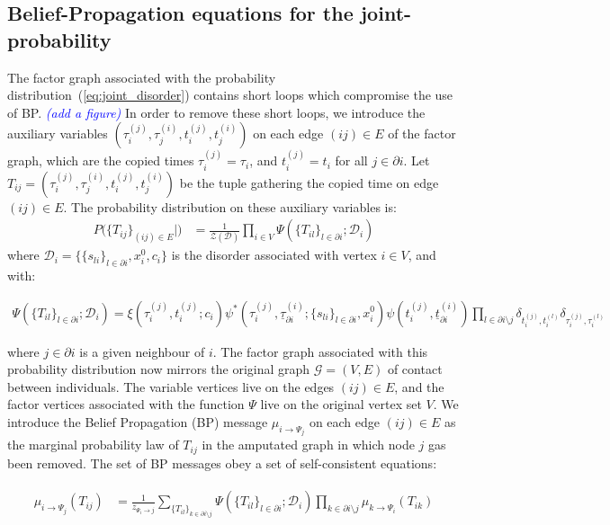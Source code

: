 \documentclass[a4paper, amsfonts, amssymb, amsmath, reprint, showkeys, nofootinbib, twoside, floatfix, pre,superscriptaddress]{revtex4-2}
\begin{document}
\subsection{Belief-Propagation equations for the joint-probability}
The factor graph associated with the probability distribution~(\ref{eq:joint_disorder}) contains short loops which compromise the use of BP. \textcolor{blue}{\it (add a figure)} 
In order to remove these short loops, we introduce the auxiliary variables $(\tau_i^{(j)},\tau_j^{(i)},t_i^{(j)},t_j^{(i)})$ on each edge $(ij)\in E$ of the factor graph, which are the copied times $\tau_i^{(j)}=\tau_i$, and $t_i^{(j)}=t_i$ for all $j\in\partial i$.
Let $T_{ij}=(\tau_i^{(j)},\tau_j^{(i)},t_i^{(j)},t_j^{(i)})$ be the tuple gathering the copied time on edge $(ij)\in E$.
The probability distribution on these auxiliary variables is:
\begin{align}
\label{eq:prob_auxiliary}
	P(\{T_{ij}\}_{(ij)\in E}|\mathcal) &= \frac{1}{\mathcal{Z}(\mathcal{D})}\prod_{i\in V}\Psi(\{T_{il}\}_{l\in\partial i};\mathcal{D}_i) 
\end{align}
where $\mathcal{D}_i=\{\{s_{li}\}_{l\in\partial i},x_i^0, c_i\}$ is the disorder associated with vertex $i\in V$, and with:
\begin{widetext}
\begin{align}
	\Psi(\{T_{il}\}_{l\in\partial i};\mathcal{D}_i) = \xi(\tau_i^{(j)},t_i^{(j)};c_i)\psi^*(\tau_i^{(j)},\underline{\tau}_{\partial i}^{(i)};\{s_{li}\}_{l\in\partial i},x_i^0)\psi(t_i^{(j)},\underline{t}_{\partial i}^{(i)})\prod_{l\in\partial i\setminus j}\delta_{t_i^{(j)},t_i^{(l)}}\delta_{\tau_i^{(j)},\tau_i^{(l)}}
\end{align}
\end{widetext}
where $j\in\partial i$ is a given neighbour of $i$. The factor graph associated with this probability distribution now mirrors the original graph $\mathcal{G}=(V,E)$ of contact between individuals.
The variable vertices live on the edges $(ij)\in E$, and the factor vertices associated with the function $\Psi$ live on the original vertex set $V$. 
We introduce the Belief Propagation (BP) message $\mu_{i\to \Psi_j}$ on each edge $(ij)\in E$ as the marginal probability law of $T_{ij}$ in the amputated graph in which node $j$ gas been removed.
The set of BP messages obey a set of self-consistent equations:
\begin{widetext}	
\begin{align}
\label{eq:BP_equations}
\begin{aligned}
	\mu_{i\to \Psi_j}(T_{ij}) &= \frac{1}{z_{\Psi_i\to j}}\sum_{\{T_{il}\}_{k\in\partial i \setminus j}}\Psi(\{T_{il}\}_{l\in\partial i};\mathcal{D}_i)\prod_{k\in\partial i \setminus j}\mu_{k\to\Psi_i}(T_{ik})
\end{aligned}
\end{align}
\end{widetext}	
\end{document}

